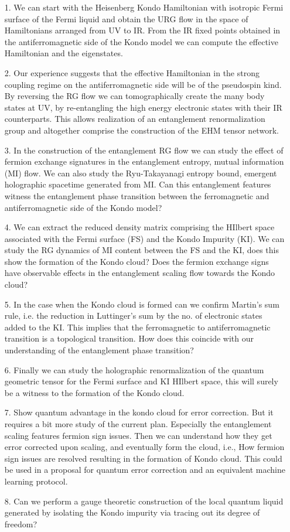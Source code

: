 \documentclass[aps,prl,preprint,groupedaddress]{revtex4-2}
\begin{document}
\begin{enumerate}
\item[1.]We can start with the Heisenberg Kondo Hamiltonian with isotropic Fermi surface of the Fermi liquid and obtain the URG flow in the space of Hamiltonians arranged from UV to IR. From the IR fixed points obtained in the antiferromagnetic side of the Kondo model we can compute the effective Hamiltonian and the eigenstates.
\item[2.]Our experience suggests that the effective Hamiltonian in the strong coupling regime on the antiferromagnetic side will be of the pseudospin kind. By reversing the RG flow we can tomographically create the many body states at UV, by re-entangling the high energy electronic states with their IR counterparts. This allows realization of an entanglement renormalization group and altogether comprise the construction of the EHM tensor network.
\item[3.]In the construction of the entanglement RG flow we can study the effect of fermion exchange signatures in the entanglement entropy, mutual information (MI) flow. We can also study the Ryu-Takayanagi entropy bound, emergent holographic spacetime generated from MI. Can this entanglement features witness the entanglement phase transition between the ferromagnetic and antiferromagnetic side of the Kondo model?
\item[4.]We can extract the reduced density matrix comprising the HIlbert space associated with the Fermi surface (FS) and the Kondo Impurity (KI). We can study the RG dynamics of MI content between the FS and the KI, does this show the formation of the Kondo cloud? Does the fermion exchange signs have observable effects in the entanglement scaling flow towards the Kondo cloud?
\item[5.]In the case when the Kondo cloud is formed can we confirm Martin’s sum rule, i.e. the reduction in Luttinger’s sum by the no. of electronic states added to the KI. This implies that the ferromagnetic to antiferromagnetic transition is a topological transition. How does this coincide with our understanding of the entanglement phase transition?
\item[6.]Finally we can study the holographic renormalization of the quantum geometric tensor for the Fermi surface and KI HIlbert space, this will surely be a witness to the formation of the Kondo cloud.
\item[7.]Show quantum advantage in the kondo cloud for error correction. But it requires a bit more study of the current plan. Especially the entanglement scaling features fermion sign issues. Then we can understand how they get error corrected upon scaling, and eventually form the cloud, i.e., How fermion sign issues are resolved resulting in the formation of Kondo cloud. This could be used in a proposal for quantum error correction and an equivalent machine learning protocol.
\item[8.]Can we perform a gauge theoretic construction of the local quantum liquid generated by isolating the Kondo impurity via tracing out its degree of freedom?
\end{enumerate}
\end{document}
